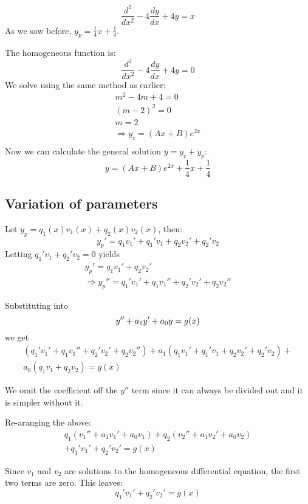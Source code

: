 \documentclass[a4paper,10pt]{article}
\begin{document}
\begin{ex}
	\[
		\frac{d^2}{dx^2} - 4\frac{dy}{dx} + 4y = x
	\]
	As we saw before, $y_p = \frac{1}{4}x + \frac{1}{4}$.

	The homogeneous function is:
	\[
		\frac{d^2}{dx^2} - 4\frac{dy}{dx} + 4y = 0
	\]
	We solve using the same method as earlier:
	\begin{gather*}
		m^2 - 4m + 4 = 0 \\
		(m - 2)^2 = 0 \\
		m = 2 \\
		\Rightarrow y_c = (Ax+B)e^{2x} \\
	\end{gather*}
	Now we can calculate the general solution $y = y_c + y_p$:
	\[
		y = (Ax+B)e^{2x} + \frac{1}{4}x + \frac{1}{4}
	\]
\end{ex}

\subsection{Variation of parameters}

Let $y_p = q_1(x) v_1(x) + q_2(x) v_2(x)$, then:
\[
	y_p' = q_1v_1' + q_1'v_1 + q_2v_2' + q_2'v_2
\]
Letting $q_1'v_1 + q_2'v_2 = 0$ yields
\begin{gather*}
	y_p' = q_1v_1' + q_2v_2' \\
	\Rightarrow y_p'' = q_1'v_1' + q_1v_1'' + q_2'v_2' + q_2v_2''
\end{gather*}

Substituting into
\[
	y'' + a_1 y' + a_0 y = g(x) \\
\]
we get
\begin{multline*}
	(q_1'v_1' + q_1v_1'' + q_2'v_2' + q_2v_2'') +
	a_1(q_1v_1' + q_1'v_1 + q_2v_2' + q_2'v_2) + \\
	a_0(q_1v_1 + q_2v_2) = g(x)
\end{multline*}

We omit the coefficient off the $y''$ term since it can always be
divided out and it is simpler without it.

Re-aranging the above:
\begin{multline*}
	q_1(v_1'' + a_1v_1' + a_0v_1) + q_2(v_2'' + a_1v_2' + a_0v_2) \\
	+ q_1'v_1' + q_2'v_2' = g(x)
\end{multline*}

Since $v_1$ and $v_2$ are solutions to the homogeneous differential
equation, the first two terms are zero. This leaves:
\[
	q_1'v_1' + q_2'v_2' = g(x)
\]
\end{document}
